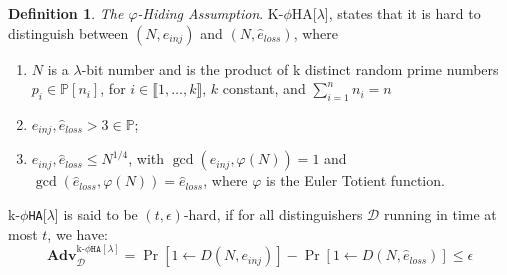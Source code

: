 \documentclass[]{final_report}
\theoremstyle{definition}
\newtheorem{definition}{Definition}[chapter]
\begin{document}
\begin{definition}
\textit{The $\varphi$-Hiding Assumption}. K-$\phi$HA[$\lambda$], states that it is hard to distinguish between $(N,e_{inj})$ and $(N,\hat{e}_{loss})$, where 
\begin{enumerate}
\item $N$ is a $\lambda$-bit number and is the product of k distinct random prime numbers $p_i \in \mathbb{P}[n_i]$, for $i \in \llbracket1, \ldots, k \rrbracket$, $k$ constant, and $\displaystyle\sum_{i=1}^{n} n_i = n$ 
\item $e_{inj}, \hat{e}_{loss} > 3 \in \mathbb{P}$;
\item $e_{inj}, \hat{e}_{loss} \leq N^{1/4}$, with $\gcd(e_{inj}, \varphi(N)) = 1$ and $\gcd(\hat{e}_{loss}, \varphi(N)) = \hat{e}_{loss}$, where $\varphi$ is the Euler Totient function. 
\end{enumerate}
k-$\phi$\texttt{HA}[$\lambda$] is said to be $(t, \epsilon)$-hard, if for all distinguishers $\mathcal{D}$ running in time at most $t$, we have:
\[
\textbf{Adv}^{\text{k-}\phi \texttt{HA}[\lambda]}_\mathcal{D} = \Pr[1 \leftarrow D(N, e_{inj})] - \Pr[1 \leftarrow D(N,\hat{e}_{loss})] \leqslant \epsilon
\]
\end{definition}






\newpage

\printbibliography
\label{endpage}
\end{document}
